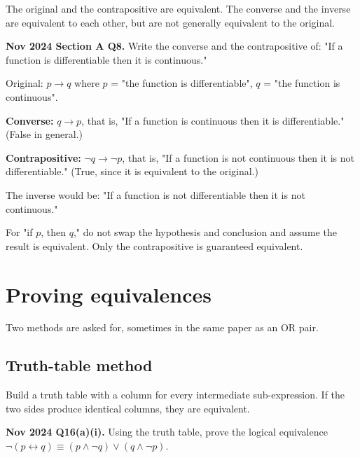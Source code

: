 \documentclass[11pt,a4paper]{article}
\begin{document}
The original and the contrapositive are equivalent. The converse and the inverse are equivalent to each other, but are not generally equivalent to the original.

\begin{pyqbox}
\textbf{Nov 2024 Section A Q8.} Write the converse and the contrapositive of: "If a function is differentiable then it is continuous."
\end{pyqbox}

\begin{solbox}
Original: $p\to q$ where $p$ = "the function is differentiable", $q$ = "the function is continuous".

\textbf{Converse:} $q\to p$, that is, "If a function is continuous then it is differentiable." (False in general.)

\textbf{Contrapositive:} $\neg q\to\neg p$, that is, "If a function is not continuous then it is not differentiable." (True, since it is equivalent to the original.)

The inverse would be: "If a function is not differentiable then it is not continuous."
\end{solbox}

\begin{dangerbox}
For "if $p$, then $q$," do not swap the hypothesis and conclusion and assume the result is equivalent. Only the contrapositive is guaranteed equivalent.
\end{dangerbox}

\section{Proving equivalences}

Two methods are asked for, sometimes in the same paper as an OR pair.

\subsection{Truth-table method}
Build a truth table with a column for every intermediate sub-expression. If the two sides produce identical columns, they are equivalent.

\begin{pyqbox}
\textbf{Nov 2024 Q16(a)(i).} Using the truth table, prove the logical equivalence $\neg(p\leftrightarrow q)\equiv(p\land\neg q)\lor(q\land\neg p)$.
\end{pyqbox}
\end{document}
